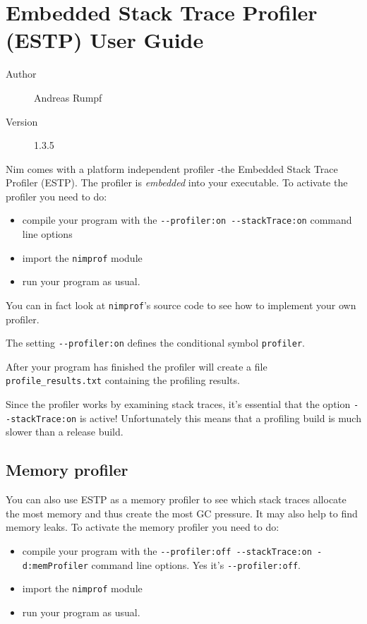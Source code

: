 \hypertarget{embedded-stack-trace-profiler-estp-user-guide}{%
\section{Embedded Stack Trace Profiler (ESTP) User
Guide}\label{embedded-stack-trace-profiler-estp-user-guide}}

\begin{description}
\item[Author]
Andreas Rumpf
\item[Version]
1.3.5
\end{description}

Nim comes with a platform independent profiler -the Embedded Stack Trace
Profiler (ESTP). The profiler is \emph{embedded} into your executable.
To activate the profiler you need to do:

\begin{itemize}
\tightlist
\item
  compile your program with the
  \texttt{-\/-profiler:on\ -\/-stackTrace:on} command line options
\item
  import the \texttt{nimprof} module
\item
  run your program as usual.
\end{itemize}

You can in fact look at \texttt{nimprof}'s source code to see how to
implement your own profiler.

The setting \texttt{-\/-profiler:on} defines the conditional symbol
\texttt{profiler}.

After your program has finished the profiler will create a file
\texttt{profile\_results.txt} containing the profiling results.

Since the profiler works by examining stack traces, it's essential that
the option \texttt{-\/-stackTrace:on} is active! Unfortunately this
means that a profiling build is much slower than a release build.

\hypertarget{memory-profiler}{%
\subsection{Memory profiler}\label{memory-profiler}}

You can also use ESTP as a memory profiler to see which stack traces
allocate the most memory and thus create the most GC pressure. It may
also help to find memory leaks. To activate the memory profiler you need
to do:

\begin{itemize}
\tightlist
\item
  compile your program with the
  \texttt{-\/-profiler:off\ -\/-stackTrace:on\ -d:memProfiler} command
  line options. Yes it's \texttt{-\/-profiler:off}.
\item
  import the \texttt{nimprof} module
\item
  run your program as usual.
\end{itemize}

